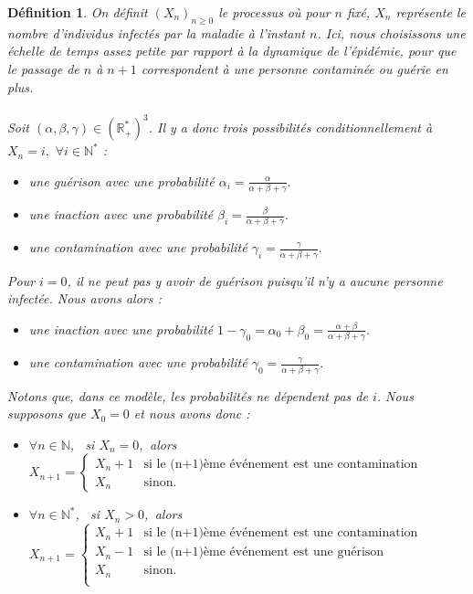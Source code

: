 \documentclass[12pt,a4paper]{report}
\newtheorem{definition}{Définition}[section]
\theoremstyle{remark}
\begin{document}
\begin{definition}\label{def_modele_simple}
On définit $(X_n)_{n\geq0}$ le processus où pour $n$ fixé, $X_n$  représente le nombre d'individus infectés par la maladie à l'instant $n$. Ici, nous choisissons une échelle de temps assez petite par rapport à la dynamique de l'épidémie, pour que le passage de $n$ à $n+1$ correspondent à une personne contaminée ou guérie en plus.
\\
\\
Soit $(\alpha, \beta, \gamma) \in (\mathbb{R}_+^*)^3$. Il y a donc trois possibilités conditionnellement à $X_n = i, \, \, \forall i \in \mathbb{N}^*$ :
\\
\begin{itemize}
\item une guérison avec une probabilité $\alpha_i=\frac{\alpha}{\alpha+\beta+\gamma}.$
\item une inaction avec une probabilité $\beta_i=\frac{\beta}{\alpha+\beta+\gamma}.$
\item une contamination avec une probabilité $\gamma_i=\frac{\gamma}{\alpha+\beta+\gamma}.$
\end{itemize}
\vspace{0.5cm}
Pour $i=0$, il ne peut pas y avoir de guérison puisqu'il n'y a aucune personne infectée. Nous avons alors :
\\
\begin{itemize}
\item une inaction avec une probabilité $1-\gamma_0=\alpha_0 + \beta_0 = \frac{\alpha + \beta}{\alpha+\beta+\gamma}.$
\item une contamination avec une probabilité $\gamma_0=\frac{\gamma}{\alpha+\beta+\gamma}.$
\end{itemize}
\vspace{0.5cm}

Notons que, dans ce modèle, les probabilités ne dépendent pas de $i$. Nous supposons que $X_{0} = 0$ et nous avons donc :
\begin{itemize}
\item $\forall n \in \mathbb{N}$, \, si $X_n=0$,\, alors $X_{n+1} = \left\{
    \begin{array}{ll}
        X_n+1 & \mbox{si le (n+1)ème événement est une contamination } \\
        X_n & \mbox{sinon. }
    \end{array}
\right. $
\item $\forall n \in \mathbb{N}^*$, \, si $X_n > 0$,\, alors $X_{n+1} = \left\{
    \begin{array}{ll}
        X_n+1 & \mbox{si le (n+1)ème événement est une contamination} \\
        X_n-1 & \mbox{si le (n+1)ème événement est une guérison} \\
        X_n & \mbox{sinon. }\\
    \end{array}
\right. $
\end{itemize}
\end{definition}
\end{document}
